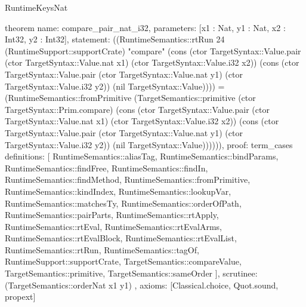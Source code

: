 \begin{lexlean}{RuntimeKeysNat}
\begin{semanticmodule}
theorem{
  name: compare_pair_nat_i32,
  parameters: [x1 : Nat, y1 : Nat, x2 : Int32, y2 : Int32],
  statement: ((RuntimeSemantics::rtRun 24 (RuntimeSupport::supportCrate) "compare" (cons (ctor TargetSyntax::Value.pair (ctor TargetSyntax::Value.nat x1) (ctor TargetSyntax::Value.i32 x2)) (cons (ctor TargetSyntax::Value.pair (ctor TargetSyntax::Value.nat y1) (ctor TargetSyntax::Value.i32 y2)) (nil TargetSyntax::Value)))) = (RuntimeSemantics::fromPrimitive (TargetSemantics::primitive (ctor TargetSyntax::Prim.compare) (cons (ctor TargetSyntax::Value.pair (ctor TargetSyntax::Value.nat x1) (ctor TargetSyntax::Value.i32 x2)) (cons (ctor TargetSyntax::Value.pair (ctor TargetSyntax::Value.nat y1) (ctor TargetSyntax::Value.i32 y2)) (nil TargetSyntax::Value)))))),
  proof: term_cases{
    definitions: [
      RuntimeSemantics::aliasTag,
      RuntimeSemantics::bindParams,
      RuntimeSemantics::findFree,
      RuntimeSemantics::findIn,
      RuntimeSemantics::findMethod,
      RuntimeSemantics::fromPrimitive,
      RuntimeSemantics::kindIndex,
      RuntimeSemantics::lookupVar,
      RuntimeSemantics::matchesTy,
      RuntimeSemantics::orderOfPath,
      RuntimeSemantics::pairParts,
      RuntimeSemantics::rtApply,
      RuntimeSemantics::rtEval,
      RuntimeSemantics::rtEvalArms,
      RuntimeSemantics::rtEvalBlock,
      RuntimeSemantics::rtEvalList,
      RuntimeSemantics::rtRun,
      RuntimeSemantics::tagOf,
      RuntimeSupport::supportCrate,
      TargetSemantics::compareValue,
      TargetSemantics::primitive,
      TargetSemantics::sameOrder
    ],
    scrutinee: (TargetSemantics::orderNat x1 y1)
  },
  axioms: [Classical.choice, Quot.sound, propext]
}


\end{semanticmodule}
\end{lexlean}
